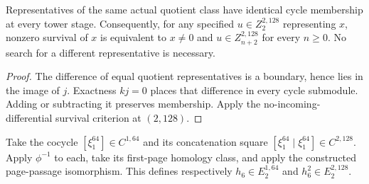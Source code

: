 \begin{proposition}
  \label{prop:h6-specified-representative-liftability}
  \leanok
  Representatives of the same actual quotient class have identical cycle
  membership at every tower stage. Consequently, for any specified
  $u\in Z_2^{2,128}$ representing $x$, nonzero survival of $x$ is equivalent
  to $x\ne0$ and $u\in Z_{n+2}^{2,128}$ for every $n\ge0$.
  No search for a different representative is necessary.
\end{proposition}
\begin{proof}
  The difference of equal quotient representatives is a boundary, hence
  lies in the image of $j$. Exactness $kj=0$ places that difference in
  every cycle submodule. Adding or subtracting it preserves membership.
  Apply the no-incoming-differential survival criterion at $(2,128)$.
  \leanok
\end{proof}

\begin{definition}
  \label{def:h6-constructed-square}
  \leanok
  Take the cocycle $[\xi_1^{64}]\in C^{1,64}$ and its concatenation square
  $[\xi_1^{64}\mid\xi_1^{64}]\in C^{2,128}$.
  Apply $\phi^{-1}$ to each, take its first-page homology class, and apply
  the constructed page-passage isomorphism.  This defines respectively
  $h_6\in E_2^{1,64}$ and $h_6^2\in E_2^{2,128}$.
\end{definition}

